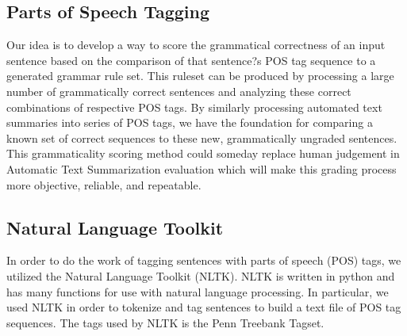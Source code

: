 \documentclass[11pt,a4paper]{article}
\begin{document}
\begin{multicols}{2}
\section{Parts of Speech Tagging}
Our idea is to develop a way to score the grammatical correctness of an input sentence based on the comparison of that sentence?s POS tag sequence to a generated grammar rule set. This ruleset can be produced by processing a large number of grammatically correct sentences and analyzing these correct combinations of respective POS tags. By similarly processing automated text summaries into series of POS tags, we have the foundation for comparing a known set of correct sequences to these new, grammatically ungraded sentences. This grammaticality scoring method could someday replace human judgement in Automatic Text Summarization evaluation which will make this grading process more objective, reliable, and repeatable.


\subsection{Natural Language Toolkit}

In order to do the work of tagging sentences with parts of speech (POS) tags, we utilized the Natural Language Toolkit (NLTK). \cite{nltk} NLTK is written in python and has many functions for use with natural language processing. In particular, we used NLTK in order to tokenize and tag sentences to build a text file of POS tag sequences. The tags used by NLTK is the Penn Treebank Tagset.


\end{multicols}
\end{document}
